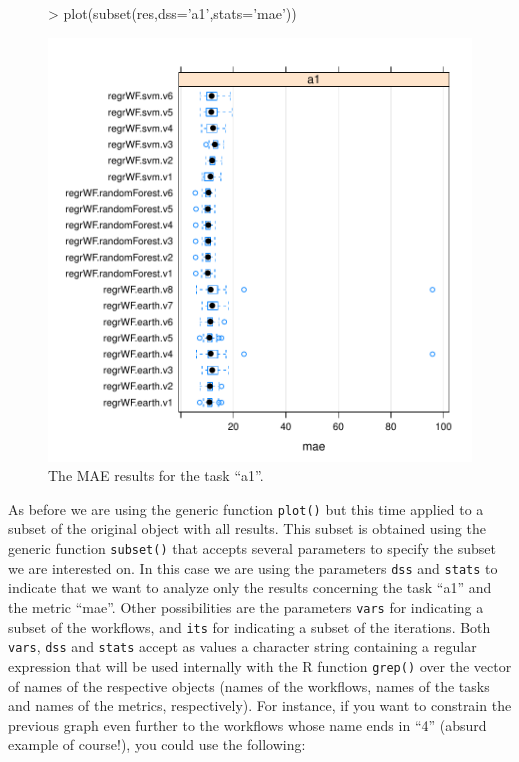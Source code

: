 \documentclass[10pt,a4paper]{article}
\begin{document}
\begin{figure}[ht]
  \centering
\begin{Schunk}
\begin{Sinput}
> plot(subset(res,dss='a1',stats='mae'))
\end{Sinput}
\end{Schunk}
\includegraphics{compExps-030}
  \caption{The MAE results for the task ``a1''.}
  \label{fig:maeA1}
\end{figure}

As before we are using the generic function \texttt{plot()} but this
time applied to a subset of the original object with all results. This
subset is obtained using the generic function \texttt{subset()} that
accepts several parameters to specify the subset we are interested
on. In this case we are using the parameters \texttt{dss} and
\texttt{stats} to indicate that we want to analyze only the results
concerning the task ``a1'' and the metric ``mae''. Other possibilities
are the parameters \texttt{vars} for indicating a subset of the
workflows, and \texttt{its} for indicating a subset of the
iterations. Both \texttt{vars}, \texttt{dss} and \texttt{stats} accept
as values a character string containing a regular expression that will
be used internally with the R function \texttt{grep()} over the vector
of names of the respective objects (names of the workflows, names of
the tasks and names of the metrics, respectively). For instance, if
you want to constrain the previous graph even further to the workflows
whose name ends in ``4'' (absurd example of course!), you could use
the following:
\end{document}
